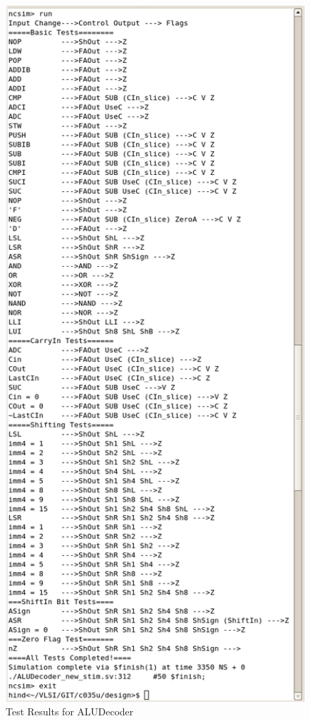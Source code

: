 \begin{figure}[h]
	\centering
	\includegraphics[scale=0.56]{results/ALUDecoder.png}
	\caption{Test Results for ALUDecoder}
	\label{fig:ALUDecoderRes}
\end{figure}
